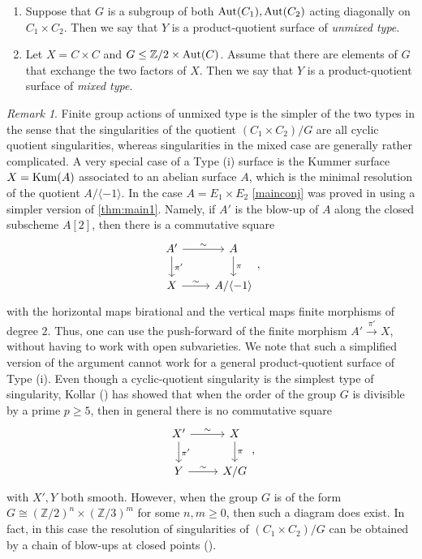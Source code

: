 \documentclass[12pt]{amsart}
\theoremstyle{remark}
\newtheorem{rem}[rem]{Remark}
\newcommand{\Z}{{\mathbb Z}}
\renewcommand{\1}{{\mathbb{S}}}
\newcommand{\<}{\langle}
\renewcommand{\>}{\rangle}
\newcommand{\Kum}{{\rm Kum}}
\newcommand{\Aut}{{\rm Aut}}
\begin{document}
\begin{enumerate}
    \item[(i)] Suppose that $G$ is a subgroup of both $\Aut(C_1), \Aut(C_2)$ acting diagonally on $C_1\times C_2$. Then we say that $Y$ is a product-quotient surface of \textit{unmixed type}. 
    \item[(ii)] Let $X=C\times C$ and $G\leq \Z/2\times\Aut(C)$. Assume that there are elements of $G$ that exchange the two factors of $X$. Then we say that $Y$ is a product-quotient surface of \textit{mixed type}.  
\end{enumerate}

\begin{rem}\label{rem:resolutionsings} Finite group actions of unmixed type is the simpler of the two types in the sense that the singularities of the quotient $(C_1\times C_2)/G$ are all cyclic quotient singularities, whereas singularities in the mixed case are generally rather complicated. A very special case of a Type (i) surface is the Kummer surface $X=\Kum(A)$ associated to an abelian surface $A$, which is the minimal resolution of the quotient $A/\langle -1\rangle$. In the case $A=E_1\times E_2$ \autoref{mainconj} was proved in \cite[Theorem 1.2]{GL24} using a simpler version of \autoref{thm:main1}. Namely, if $A'$ is the blow-up of $A$ along the closed subscheme $A[2]$, then there is a commutative square 
\[\begin{tikzcd} A' \ar{r}{\sim} \ar{d}{\pi'} & A \ar{d}{\pi} \\
X \ar{r}{\sim} & A/\langle -1\rangle  
\end{tikzcd},\]
with the horizontal maps birational and the vertical maps finite morphisms of degree $2$. Thus, one can use the push-forward of the finite morphism $A'\xrightarrow{\pi'} X$, without having to work with open subvarieties. We note that such a simplified version of the argument cannot work for a general product-quotient surface of Type (i). Even though a cyclic-quotient singularity is the simplest type of singularity, Kollar (\cite[Example 2.30]{Kol}) has showed that when the order of the group $G$ is divisible by a prime $p\geq 5$, then in general there is no commutative square 
\[\begin{tikzcd} X' \ar{r}{\sim} \ar{d}{\pi'} & X \ar{d}{\pi} \\
Y \ar{r}{\sim} & X/G
\end{tikzcd},\] with $X', Y$ both smooth. However, when the group $G$ is of the form $G\cong(\Z/2)^n\times(\Z/3)^m$ for some $n,m\geq 0$, then such a diagram does exist. In fact, in this case the resolution of singularities of $(C_1\times C_2)/G$ can be obtained by a chain of blow-ups at closed points (\cite[Claim 2.29.1]{Kol}).  
\end{rem} 
\end{document}
